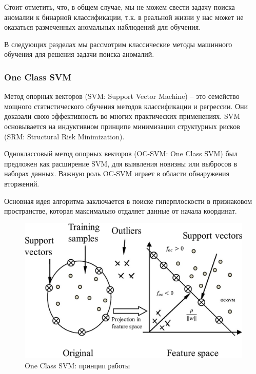 \documentclass[12pt]{article}
\begin{document}
    \par Стоит отметить, что, в общем случае, мы не можем свести задачу поиска аномалии к бинарной классификации, т.к. в реальной жизни у нас может не оказаться размеченных аномальных наблюдений для обучения.

    \par В следующих разделах мы рассмотрим классические методы машинного обучения для решения задачи поиска аномалий.


    \subsubsection{One Class SVM}
    \label{sec:Research:Model:OneClassSVM}

    \par Метод опорных векторов (SVM: Support Vector Machine) \cite{SVM} -- это семейство мощного статистического обучения методов классификации и регрессии. Они доказали свою эффективность во многих практических применениях. SVM основывается на индуктивном принципе минимизации структурных рисков (SRM: Structural Risk Minimization).

    \par Одноклассовый метод опорных векторов (OC-SVM: One Class SVM) \cite{OC-SVM} был предложен как расширение SVM, для выявления новизны или выбросов в наборах данных. Важную роль OC-SVM играет в области обнаружения вторжений.

    \par Основная идея алгоритма заключается в поиске гиперплоскости в признаковом пространстве, которая максимально отдаляет данные от начала координат.

    \begin{figure}[h!]
        \centering
        \includegraphics[width=0.8\linewidth]{OneClassSVM.png}
        \caption{One Class SVM: принцип работы}
        \label{sec:Research:Model:OneClassSVM:fig:OneClassSVM}
    \end{figure}
\end{document}
